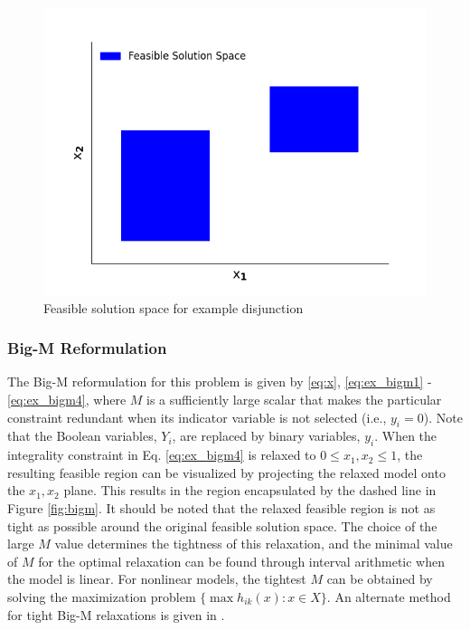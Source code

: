 \documentclass{juliacon}
\begin{document}
\begin{figure}%
    \centering
    \includegraphics[scale=0.5]{solnspace.png}
    \caption{Feasible solution space for example disjunction}
    \label{fig:reform_figure}
\end{figure}
\vskip 6pt

 \subsubsection{Big-M Reformulation}
 The Big-M reformulation for this problem is given by \eqref{eq:x}, \eqref{eq:ex_bigm1} - \eqref{eq:ex_bigm4}, where $M$ is a sufficiently large scalar that makes the particular constraint redundant when its indicator variable is not selected (i.e., $y_i = 0$). Note that the Boolean variables, $Y_i$, are replaced by binary variables, $y_i$. When the integrality constraint in Eq. \eqref{eq:ex_bigm4} is relaxed to $0 \leq x_1, x_2 \leq 1$, the resulting feasible region can be visualized by projecting the relaxed model onto the $x_1, x_2$ plane. This results in the region encapsulated by the dashed line in Figure \ref{fig:bigm}. It should be noted that the relaxed feasible region is not as tight as possible around the original feasible solution space. The choice of the large $M$ value determines the tightness of this relaxation, and the minimal value of $M$ for the optimal relaxation can be found through interval arithmetic when the model is linear. For nonlinear models, the tightest $M$ can be obtained by solving the maximization problem $\{\max h_{ik}(x): x \in X\}$. An alternate method for tight Big-M relaxations is given in \cite{TRESPALACIOS201598}.
 
\end{document}
